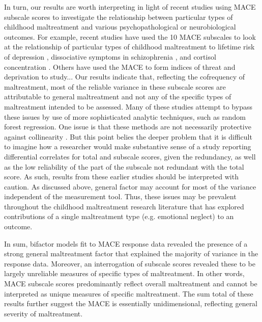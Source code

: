 \documentclass[letterpaper,man,natbib]{apa6}  %
\begin{document}
In turn, our results are worth interpreting in light of recent studies using MACE subscale scores to investigate the relationship between particular types of childhood maltreatment and various psychopathological or neurobiological outcomes. For example, recent studies have used the 10 MACE subscales to look at the relationship of particular types of childhood maltreatment to lifetime risk of depression \citep{gerke2018childhood}, dissociative symptoms in schizophrenia \citep{schalinski2015type}, and cortisol concentration \citep{schalinski2019early}. Others have used the MACE to form indices of threat and deprivation to study... Our results indicate that, reflecting the cofrequency of maltreatment, most of the reliable variance in these subscale scores are attributable to general maltreatment and not any of the specific types of maltreatment intended to be assessed. Many of these studies attempt to bypass these issues by use of more sophisticated analytic techniques, such as random forest regression. One issue is that these methods are not necessarily protective against collinearity \citep{gregorutti2017correlation}. But this point belies the deeper problem that it is difficult to imagine how a researcher would make substantive sense of a study reporting differential correlates for total and subscale scores, given the redundancy, as well as the low reliability of the part of the subscale not redundant with the total score. As such, results from these earlier studies should be interpreted with caution. As discussed above, general factor may account for most of the variance independent of the measurement tool. Thus, these issues may be prevalent throughout the childhood maltreatment research literature that has explored contributions of a single maltreatment type (e.g. emotional neglect) to an outcome.  
 
 In sum, bifactor models fit to MACE response data revealed the presence of a strong general maltreatment factor that explained the majority of variance in the response data. Moreover, an interrogation of subscale scores revealed these to be largely unreliable measures of specific types of maltreatment. In other words, MACE subscale scores predominantly reflect overall maltreatment and cannot be interpreted as unique measures of specific maltreatment. The sum total of these results further suggest the MACE is essentially unidimensional, reflecting general severity of maltreatment. 

 
\end{document}
